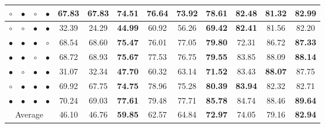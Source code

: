 \documentclass[runningheads]{llncs}
\begin{document}
\begin{table*}[!tp]
{\begin{tabular}{cccc|ccc|ccc|ccc}
$\circ$ &$\bullet$ &$\circ$ &$\bullet$               & 67.83        & 67.83     & \textbf{74.51} & 76.64  & 73.92 & \textbf{78.61}  & 82.48   & 81.32  & \textbf{82.99}     \\ \hline
$\circ$ &$\circ$ &$\bullet$ &$\bullet$               & 32.39        & 24.29     & \textbf{44.99} & 60.92  & 56.26 & \textbf{69.42}   & \textbf{82.41}  & 81.56  & 82.20       \\ \hline
$\bullet$ &$\bullet$ &$\bullet$ &$\circ$               & 68.54        & 68.60     & \textbf{75.47} & 76.01  & 77.05 & \textbf{79.80}  & 72.31 & 86.72  & \textbf{87.33}       \\ \hline
$\bullet$ &$\bullet$ &$\circ$ &$\bullet$               & 68.72        & 68.93     & \textbf{75.67} & 77.53  & 76.75 & \textbf{79.55}  & 83.85  & 88.09  & \textbf{88.14}       \\ \hline
$\bullet$ &$\circ$ &$\bullet$ &$\bullet$               & 31.07        & 32.34     & \textbf{47.70} & 60.32  & 63.14 & \textbf{71.52}  & 83.43  & \textbf{88.07}  & 87.75       \\ \hline
$\circ$ &$\bullet$ &$\bullet$ &$\bullet$               & 69.92        & 67.75     & \textbf{74.75}  & 78.96 & 75.28 & \textbf{80.39}  & \textbf{83.94}  & 82.32  & 82.71      \\ \hline
$\bullet$ &$\bullet$ &$\bullet$ &$\bullet$        & 70.24       & 69.03   & \textbf{77.61}     & 79.48  & 77.71  & \textbf{85.78}  & 84.74  & 88.46  & \textbf{89.64}      \\ \hline
\multicolumn{4}{c|}{Average}        & 46.10       & 46.76   & \textbf{59.85}     & 62.57  & 64.84  & \textbf{72.97}  & 74.05  & 79.16  & \textbf{82.94}      \\ \bottomrule
\end{tabular}}
\end{table*}
\end{document}
